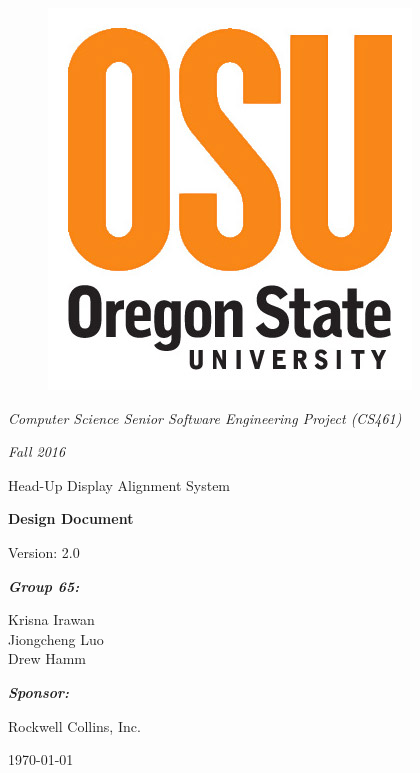 \documentclass[letterpaper,10pt,onecolumn]{IEEEtran}
\def\name{Krisna Irawan\\ Jiongcheng Luo\\ Drew Hamm}
\def\doc{Design Document}
\def\version{2.0}
\begin{document}
\begin{titlepage}
\centering
	\begin{figure}
	      	\includegraphics[scale=0.25]{osu_logo}
	\end{figure}
	{\Large\itshape Computer Science Senior Software Engineering Project (CS461)\par}
	{\Large\itshape Fall 2016\par}
	\vspace{1cm}
	\scshape{
		{\Huge Head-Up Display Alignment System\par}
		\vspace{1cm}
		{\Huge\bfseries\doc\par}
		{\large Version: \version\par}
	}
	\vspace{1cm}
	{\large\itshape\bfseries Group 65:\par}
	{\large \name\par}
	\vspace{1cm}
	{\large\itshape\bfseries Sponsor:\par}
	{\large Rockwell Collins, Inc.\par}
	\vspace{2cm}
	{\large \today\par}
	\vspace{4cm}

	\begin{abstract}
		A Head-up Display (HUD) Alignment system is developed as a proof of concept aims to explore a potential technological innovation for the HUD system that presents critical flight information to pilots. The primary objective of this project is to reduce the cost and time required to precisely align flight information to the HUD by introducing an additional sensor component to the system to make the alignment process more dynamic. This document is intended for use by Rockwell Collins and their HUD system development team. This document provides and explains an overall system framework, design viewpoints and specific design description for each viewpoint within the system.
	\end{abstract}
	\vfill

\end{titlepage}
\tableofcontents
\end{document}
